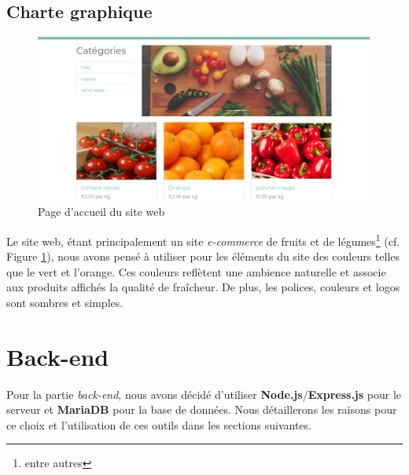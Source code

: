 \documentclass[a4paper,12pt]{report}
\theoremstyle{break}
\theoremstyle{break}
\theoremstyle{break}
\theoremstyle{break}
\theoremstyle{definition}
\theoremstyle{remark}
\begin{document}
\subsection{Charte graphique}
\begin{figure}[!ht]
  \centering
  \includegraphics[scale=0.3]{images/accueil.png}
  \caption{Page d'accueil du site web}
  \label{fig:page_accueil}
\end{figure}

Le site web, étant principalement un site \textit{e-commerce} de fruits et de légumes\footnote{entre autres} (cf. Figure \ref{fig:page_accueil}), nous avons pensé à utiliser pour les éléments du site des couleurs telles que le vert et l'orange. Ces couleurs reflètent une ambience naturelle et associe aux produits affichés la qualité de fraîcheur. De plus, les polices, couleurs et logos sont sombres et simples.
\section{Back-end}
Pour la partie \textit{back-end}, nous avons décidé d'utiliser \textbf{Node.js}/\textbf{Express.js} pour le serveur et \textbf{MariaDB} pour la base de données. Nous détaillerons les raisons pour ce choix et l'utilisation de ces outils dans les sections suivantes.
\end{document}
